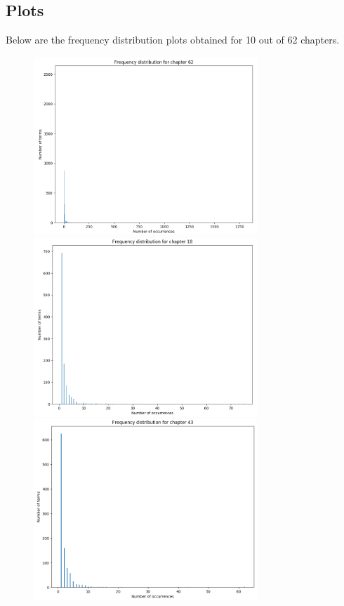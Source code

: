 \documentclass{article}
\begin{document}
\subsection{Plots}
\begin{flushleft}
	Below are the frequency distribution plots obtained for 10 out of 62 chapters. 
	\begin{figure}[H]
		\begin{minipage}{0.45\linewidth}
			\centering
			\includegraphics[width=0.75\textwidth]{./images/1-chapter_wise-frequency.png}
			\includegraphics[width=0.75\textwidth]{./images/2-chapter_wise-frequency.png}
			\includegraphics[width=0.75\textwidth]{./images/3-chapter_wise-frequency.png}

\end{minipage}
\end{figure}
\end{flushleft}
\end{document}
